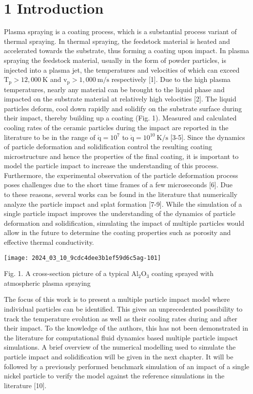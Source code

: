 \documentclass[10pt]{article}
\begin{document}
\section*{1 Introduction}
Plasma spraying is a coating process, which is a substantial process variant of thermal spraying. In thermal spraying, the feedstock material is heated and accelerated towards the substrate, thus forming a coating upon impact. In plasma spraying the feedstock material, usually in the form of powder particles, is injected into a plasma jet, the temperatures and velocities of which can exceed $\mathrm{T}_{\mathrm{p}}>12,000 \mathrm{~K}$ and $\mathrm{v}_{\mathrm{p}}>1,000 \mathrm{~m} / \mathrm{s}$ respectively [1]. Due to the high plasma temperatures, nearly any material can be brought to the liquid phase and impacted on the substrate material at relatively high velocities [2]. The liquid particles deform, cool down rapidly and solidify on the substrate surface during their impact, thereby building up a coating (Fig. 1). Measured and calculated cooling rates of the ceramic particles during the impact are reported in the literature to be in the range of $\dot{\mathrm{q}}=10^{7}$ to $\dot{\mathrm{q}}=10^{10} \mathrm{~K} / \mathrm{s}$ [3-5]. Since the dynamics of particle deformation and solidification control the resulting coating microstructure and hence the properties of the final coating, it is important to model the particle impact to increase the understanding of this process. Furthermore, the experimental observation of the particle deformation process poses challenges due to the short time frames of a few microseconds [6]. Due\\
to these reasons, several works can be found in the literature that numerically analyze the particle impact and splat formation [7-9]. While the simulation of a single particle impact improves the understanding of the dynamics of particle deformation and solidification, simulating the impact of multiple particles would allow in the future to determine the coating properties such as porosity and effective thermal conductivity.

\begin{center}
\texttt{[image: 2024\_03\_10\_9cdc4dee3b1ef59d6c5ag-101]}
\end{center}

Fig. 1. A cross-section picture of a typical $\mathrm{Al}_{2} \mathrm{O}_{3}$ coating sprayed with atmospheric plasma spraying

The focus of this work is to present a multiple particle impact model where individual particles can be identified. This gives an unprecedented possibility to track the temperature evolution as well as their cooling rates during and after their impact. To the knowledge of the authors, this has not been demonstrated in the literature for computational fluid dynamics based multiple particle impact simulations. A brief overview of the numerical modelling used to simulate the particle impact and solidification will be given in the next chapter. It will be followed by a previously performed benchmark simulation of an impact of a single nickel particle to verify the model against the reference simulations in the literature [10].
\end{document}
